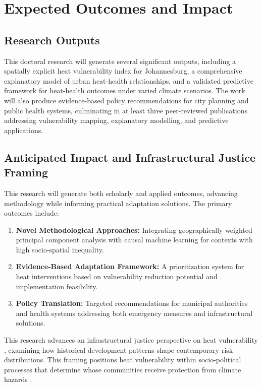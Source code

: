 \section{Expected Outcomes and Impact}

\subsection{Research Outputs}
This doctoral research will generate several significant outputs, including a spatially explicit heat vulnerability index for Johannesburg, a comprehensive explanatory model of urban heat-health relationships, and a validated predictive framework for heat-health outcomes under varied climate scenarios. The work will also produce evidence-based policy recommendations for city planning and public health systems, culminating in at least three peer-reviewed publications addressing vulnerability mapping, explanatory modelling, and predictive applications.

\subsection{Anticipated Impact and Infrastructural Justice Framing}
This research will generate both scholarly and applied outcomes, advancing methodology while informing practical adaptation solutions. The primary outcomes include:

\begin{enumerate}
    \item \textbf{Novel Methodological Approaches:} Integrating geographically weighted principal component analysis with causal machine learning for contexts with high socio-spatial inequality.
    
    \item \textbf{Evidence-Based Adaptation Framework:} A prioritization system for heat interventions based on vulnerability reduction potential and implementation feasibility.
    
    \item \textbf{Policy Translation:} Targeted recommendations for municipal authorities and health systems addressing both emergency measures and infrastructural solutions.
\end{enumerate}

This research advances an infrastructural justice perspective on heat vulnerability \citep{Romanello2023}, examining how historical development patterns shape contemporary risk distributions. This framing positions heat vulnerability within socio-political processes that determine whose communities receive protection from climate hazards \citep{IPCC2024}.

